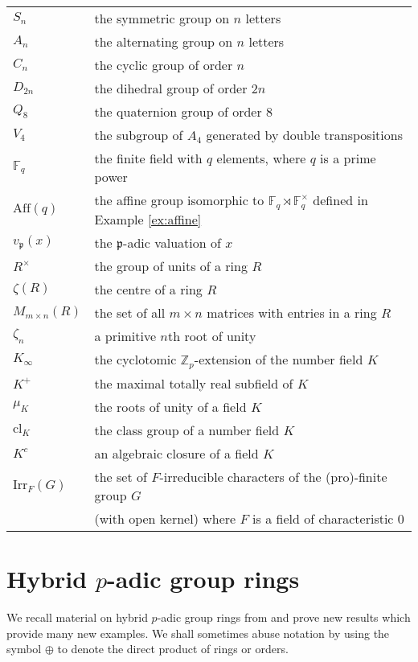 \documentclass[12pt]{amsart}
\theoremstyle{plain}
\theoremstyle{remark}
\theoremstyle{definition}
\numberwithin{equation}{section}
\begin{document}
\begin{tabular}{ll}
$S_{n}$ & the symmetric group on $n$ letters\\
$A_{n}$ & the alternating group on $n$ letters\\
$C_{n}$ & the cyclic group of order $n$\\
$D_{2n}$ & the dihedral group of order $2n$\\
$Q_{8}$ & the quaternion group of order $8$\\
$V_{4}$ & the subgroup of $A_{4}$ generated by double transpositions\\
${\mathbb{F}}_{q}$ & the finite field with $q$ elements, where $q$ is a prime power\\
${\mathrm{Aff}}(q)$ & the affine group isomorphic to ${\mathbb{F}}_{q} \rtimes {\mathbb{F}}_{q}^{\times}$ defined in Example \ref{ex:affine}\\
$v_{\mathfrak{p}}(x)$ & the $\mathfrak{p}$-adic valuation of $x$\\
$R^{\times}$ & the group of units of a ring $R$\\
$\zeta(R)$ & the centre of a ring $R$\\
$M_{m \times n} (R)$ & the set of all $m \times n$ matrices with entries in a ring $R$\\
$\zeta_{n}$ & a primitive $n$th root of unity\\
$K_{\infty}$ & the cyclotomic ${\mathbb{Z}}_{p}$-extension of the number field $K$\\
$K^{+}$ & the maximal totally real subfield of $K$\\
$\mu_{K}$ & the roots of unity of a field $K$\\
${\mathrm{cl}}_{K}$ & the class group of a number field $K$ \\
$K^{c}$ & an algebraic closure of a field $K$ \\
${\mathrm{Irr}}_{F}(G)$ & the set of $F$-irreducible characters of the (pro)-finite group $G$\\
& (with open kernel) where $F$ is a field of characteristic $0$

\end{tabular}

\section{Hybrid $p$-adic group rings} \label{sec:hybrid-group-rings}

We recall material on hybrid $p$-adic group rings from \cite[\S 2]{hybrid-ETNC}
and prove new results which provide many new examples.
We shall sometimes abuse notation by using the symbol $\oplus$ to denote the direct product of rings or orders.
\end{document}
